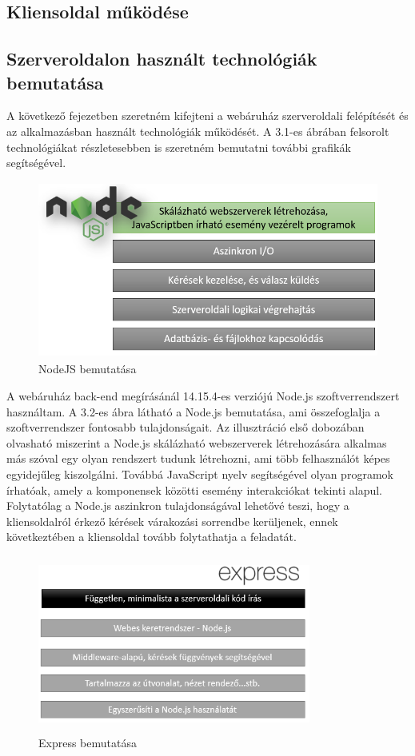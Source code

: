 \subsection{Kliensoldal működése}

\subsection{Szerveroldalon használt technológiák bemutatása}

A következő fejezetben szeretném kifejteni a webáruház szerveroldali felépítését és az alkalmazásban használt technológiák működését. A 3.1-es ábrában felsorolt technológiákat részletesebben is szeretném bemutatni további grafikák segítségével.

\begin{figure}[H]
	\centering
	\includegraphics[width=1.0\textwidth,height=220px]{images/nodejs_bemutatasa.png}
	\caption{NodeJS bemutatása}
	\label{fig.picture-3}
\end{figure}

A webáruház back-end megírásánál 14.15.4-es verziójú Node.js szoftverrendszert használtam. A 3.2-es ábra látható a Node.js bemutatása, ami összefoglalja a szoftverrendszer fontosabb tulajdonságait. Az illusztráció első dobozában olvasható miszerint a Node.js skálázható webszerverek létrehozására alkalmas más szóval egy olyan rendszert tudunk létrehozni, ami több felhasználót képes egyidejűleg kiszolgálni. Továbbá JavaScript nyelv segítségével olyan programok írhatóak, amely a komponensek közötti esemény interakciókat tekinti alapul. Folytatólag a Node.js aszinkron tulajdonságával lehetővé teszi, hogy a kliensoldalról érkező kérések várakozási sorrendbe kerüljenek, ennek következtében a kliensoldal tovább folytathatja a feladatát. 

\begin{figure}[H]
	\centering
	\includegraphics[width=0.8\textwidth,height=220px]{images/express_bemutatasa.png}
	\caption{Express bemutatása}
	\label{fig.picture-4}
\end{figure}

